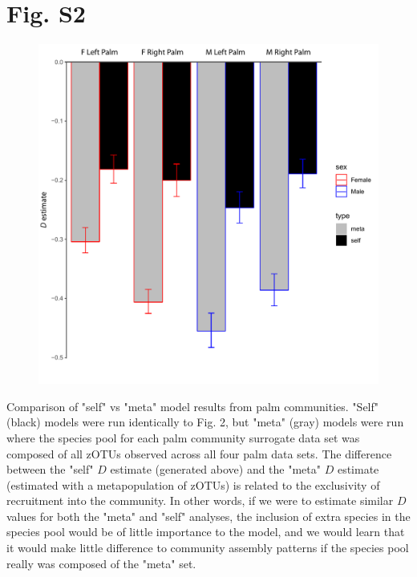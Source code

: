 \documentclass{article}
\begin{document}
\section*{Fig. S2}
\begin{figure}[ht]
	\centering
	\includegraphics[scale=0.80]{../Fig_S2.pdf}
\end{figure}
Comparison of "self" vs "meta" model results from palm communities. "Self" (black) models were run identically to Fig. 2, but "meta" (gray) models were run where the species pool for each palm community surrogate data set was composed of all zOTUs observed across all four palm data sets. The difference between the "self" \(D\) estimate (generated above) and the "meta" \(D\) estimate (estimated with a metapopulation of zOTUs) is related to the exclusivity of recruitment into the community. In other words, if we were to estimate similar \(D\) values for both the "meta" and "self" analyses, the inclusion of extra species in the species pool would be of little importance to the model, and we would learn that it would make little difference to community assembly patterns if the species pool really was composed of the "meta" set.
\newpage
%
%
\end{document}
